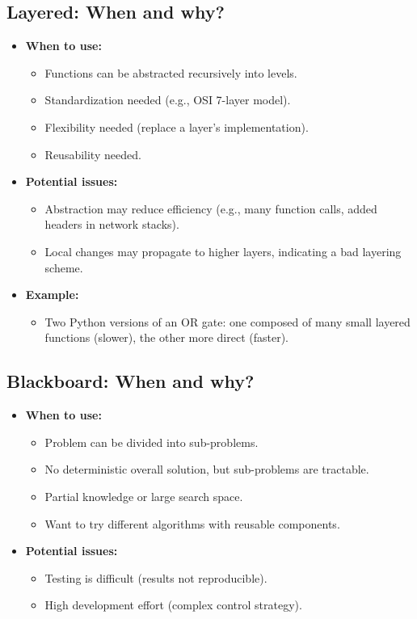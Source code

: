 \documentclass[11pt,a4paper]{article}
\begin{document}
\subsection*{Layered: When and why?}
\begin{itemize}
    \item \textbf{When to use:}
        \begin{itemize}
            \item Functions can be abstracted recursively into levels.
            \item Standardization needed (e.g., OSI 7-layer model).
            \item Flexibility needed (replace a layer's implementation).
            \item Reusability needed.
        \end{itemize}
    \item \textbf{Potential issues:}
        \begin{itemize}
            \item Abstraction may reduce efficiency (e.g., many function calls, added headers in network stacks).
            \item Local changes may propagate to higher layers, indicating a bad layering scheme.
        \end{itemize}
    \item \textbf{Example:}
        \begin{itemize}
            \item Two Python versions of an OR gate: one composed of many small layered functions (slower), the other more direct (faster).
        \end{itemize}
\end{itemize}

\subsection*{Blackboard: When and why?}
\begin{itemize}
    \item \textbf{When to use:}
        \begin{itemize}
            \item Problem can be divided into sub-problems.
            \item No deterministic overall solution, but sub-problems are tractable.
            \item Partial knowledge or large search space.
            \item Want to try different algorithms with reusable components.
        \end{itemize}
    \item \textbf{Potential issues:}
        \begin{itemize}
            \item Testing is difficult (results not reproducible).
            \item High development effort (complex control strategy).
        \end{itemize}
\end{itemize}
\end{document}
